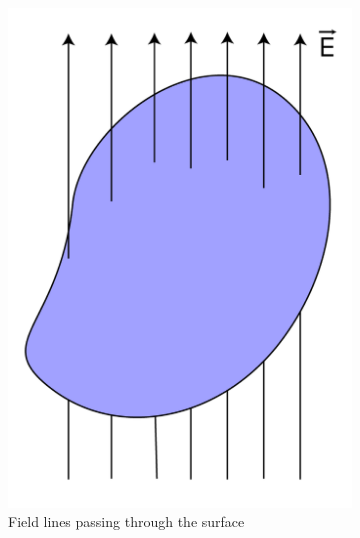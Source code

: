 \begin{figure}[H]
  \centering
  \begin{subfigure}[t]{0.3\textwidth}
      \includegraphics[scale = 0.5]{Images/Chapter-11/11.13a.png}
      \caption{Field lines passing through the surface}
      \label{fig:11.13(a)}
  \end{subfigure}
  \begin{subfigure}[t]{0.3\textwidth}

\end{subfigure}
\end{figure}

